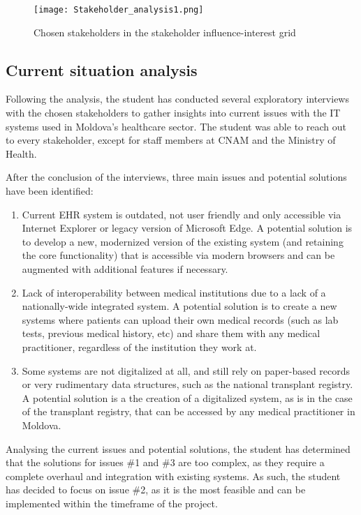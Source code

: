 \begin{figure}[ht]
    \centering
    \texttt{[image: Stakeholder\_analysis1.png]}
    \caption{Chosen stakeholders in the stakeholder influence-interest grid}
    \label{fig:stakeholder_analysis1}
\end{figure}

\subsection{Current situation analysis}

Following the analysis, the student has conducted several exploratory interviews with the chosen stakeholders to gather insights into current issues with the IT systems used in Moldova's healthcare sector. The student was able to reach out to every stakeholder, except for staff members at CNAM and the Ministry of Health. 

After the conclusion of the interviews, three main issues and potential solutions have been identified:

\begin{enumerate}
    \item Current EHR system is outdated, not user friendly and only accessible via Internet Explorer or legacy version of Microsoft Edge. A potential solution is to develop a new, modernized version of the existing system (and retaining the core functionality) that is accessible via modern browsers and can be augmented with additional features if necessary.
    \item Lack of interoperability between medical institutions due to a lack of a nationally-wide integrated system. A potential solution is to create a new systems where patients can upload their own medical records (such as lab tests, previous medical history, etc) and share them with any medical practitioner, regardless of the institution they work at. 
    \item Some systems are not digitalized at all, and still rely on paper-based records or very rudimentary data structures, such as the national transplant registry. A potential solution is a the creation of a digitalized system, as is in the case of the transplant registry, that can be accessed by any medical practitioner in Moldova.
\end{enumerate}

Analysing the current issues and potential solutions, the student has determined that the solutions for issues \#1 and \#3 are too complex, as they require a complete overhaul and integration with existing systems. As such, the student has decided to focus on issue \#2, as it is the most feasible and can be implemented within the timeframe of the project. 

